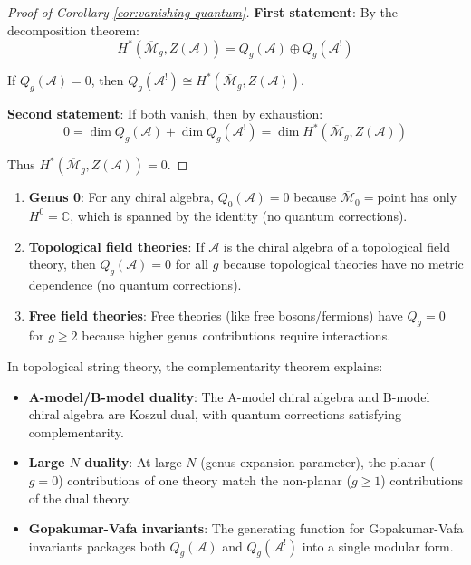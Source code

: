 \begin{proof}[Proof of Corollary \ref{cor:vanishing-quantum}]
\textbf{First statement}: By the decomposition theorem:
\begin{equation}
H^*(\overline{\mathcal{M}}_g, Z(\mathcal{A})) = Q_g(\mathcal{A}) \oplus Q_g(\mathcal{A}^!)
\end{equation}

If $Q_g(\mathcal{A}) = 0$, then $Q_g(\mathcal{A}^!) \cong H^*(\overline{\mathcal{M}}_g, 
Z(\mathcal{A}))$.

\textbf{Second statement}: If both vanish, then by exhaustion:
\begin{equation}
0 = \dim Q_g(\mathcal{A}) + \dim Q_g(\mathcal{A}^!) = \dim H^*(\overline{\mathcal{M}}_g, 
Z(\mathcal{A}))
\end{equation}

Thus $H^*(\overline{\mathcal{M}}_g, Z(\mathcal{A})) = 0$.
\end{proof}

\begin{remark}
\begin{enumerate}
\item \textbf{Genus 0}: For any chiral algebra, $Q_0(\mathcal{A}) = 0$ because 
$\overline{\mathcal{M}}_0 = \text{point}$ has only $H^0 = \mathbb{C}$, which is 
spanned by the identity (no quantum corrections).

\item \textbf{Topological field theories}: If $\mathcal{A}$ is the chiral algebra of 
a topological field theory, then $Q_g(\mathcal{A}) = 0$ for all $g$ because topological 
theories have no metric dependence (no quantum corrections).

\item \textbf{Free field theories}: Free theories (like free bosons/fermions) have 
$Q_g = 0$ for $g \geq 2$ because higher genus contributions require interactions.
\end{enumerate}
\end{remark}

\begin{corollary}
\label{cor:string-theory-complementarity-explicit}
In topological string theory, the complementarity theorem explains:
\begin{itemize}
\item \textbf{A-model/B-model duality}: The A-model chiral algebra and B-model chiral 
algebra are Koszul dual, with quantum corrections satisfying complementarity.

\item \textbf{Large $N$ duality}: At large $N$ (genus expansion parameter), the 
planar ($g=0$) contributions of one theory match the non-planar ($g \geq 1$) 
contributions of the dual theory.

\item \textbf{Gopakumar-Vafa invariants}: The generating function for Gopakumar-Vafa 
invariants packages both $Q_g(\mathcal{A})$ and $Q_g(\mathcal{A}^!)$ into a single 
modular form.
\end{itemize}
\end{corollary}

